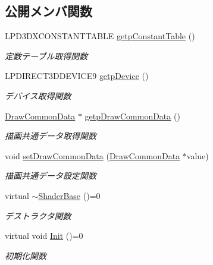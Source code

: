 \subsection*{公開メンバ関数}
\begin{DoxyCompactItemize}
\item 
L\+P\+D3\+D\+X\+C\+O\+N\+S\+T\+A\+N\+T\+T\+A\+B\+LE \mbox{\hyperlink{class_shader_base_a89f6e1ba14f7db57248c794356f9b076}{getp\+Constant\+Table}} ()
\begin{DoxyCompactList}\small\item\em 定数テーブル取得関数 \end{DoxyCompactList}\item 
L\+P\+D\+I\+R\+E\+C\+T3\+D\+D\+E\+V\+I\+C\+E9 \mbox{\hyperlink{class_shader_base_aa16d631f799060854de36a024dcfce48}{getp\+Device}} ()
\begin{DoxyCompactList}\small\item\em デバイス取得関数 \end{DoxyCompactList}\item 
\mbox{\hyperlink{class_draw_common_data}{Draw\+Common\+Data}} $\ast$ \mbox{\hyperlink{class_shader_base_a7637faa8fe5aa027dc91e00cfee26f33}{getp\+Draw\+Common\+Data}} ()
\begin{DoxyCompactList}\small\item\em 描画共通データ取得関数 \end{DoxyCompactList}\item 
void \mbox{\hyperlink{class_shader_base_abbffa59fae48651c11489de37a88b190}{set\+Draw\+Common\+Data}} (\mbox{\hyperlink{class_draw_common_data}{Draw\+Common\+Data}} $\ast$value)
\begin{DoxyCompactList}\small\item\em 描画共通データ設定関数 \end{DoxyCompactList}\item 
virtual \mbox{\hyperlink{class_shader_base_a3b7c2337128ca825093ab3a47bce4084}{$\sim$\+Shader\+Base}} ()=0
\begin{DoxyCompactList}\small\item\em デストラクタ関数 \end{DoxyCompactList}\item 
virtual void \mbox{\hyperlink{class_shader_base_a9622b2f5e0184a78d3af82820dc5113d}{Init}} ()=0
\begin{DoxyCompactList}\small\item\em 初期化関数 \end{DoxyCompactList}\item 

\end{DoxyCompactItemize}
